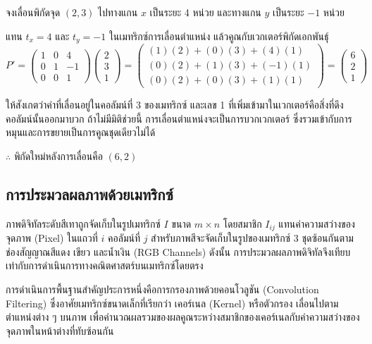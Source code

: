 \begin{ex}
\label{ex:translation-2d}
จงเลื่อนพิกัดจุด $(2, 3)$ ไปทางแกน $x$ เป็นระยะ 4 หน่วย และทางแกน $y$ เป็นระยะ $-1$ หน่วย
\end{ex}
\begin{solution}
แทน $t_x = 4$ และ $t_y = -1$ ในเมทริกซ์การเลื่อนตำแหน่ง แล้วคูณกับเวกเตอร์พิกัดเอกพันธุ์
\[ P' = \begin{pmatrix} 1 & 0 & 4 \\ 0 & 1 & -1 \\ 0 & 0 & 1 \end{pmatrix} \begin{pmatrix} 2 \\ 3 \\ 1 \end{pmatrix} = \begin{pmatrix} (1)(2)+(0)(3)+(4)(1) \\ (0)(2)+(1)(3)+(-1)(1) \\ (0)(2)+(0)(3)+(1)(1) \end{pmatrix} = \begin{pmatrix} 6 \\ 2 \\ 1 \end{pmatrix} \]

ให้สังเกตว่าค่าที่เลื่อนอยู่ในคอลัมน์ที่ 3 ของเมทริกซ์ และเลข 1 ที่เพิ่มเข้ามาในเวกเตอร์คือสิ่งที่ดึงคอลัมน์นั้นออกมาบวก ถ้าไม่มีมิติช่วยนี้ การเลื่อนตำแหน่งจะเป็นการบวกเวกเตอร์ ซึ่งรวมเข้ากับการหมุนและการขยายเป็นการคูณชุดเดียวไม่ได้

$\therefore$ พิกัดใหม่หลังการเลื่อนคือ $(6, 2)$ \solhere
\end{solution}

\subsection{การประมวลผลภาพด้วยเมทริกซ์}
\label{ssec:image-processing-matrix}
ภาพดิจิทัลระดับสีเทาถูกจัดเก็บในรูปเมทริกซ์ $I$ ขนาด $m \times n$ โดยสมาชิก $I_{ij}$ แทนค่าความสว่างของจุดภาพ (Pixel) ในแถวที่ $i$ คอลัมน์ที่ $j$ สำหรับภาพสีจะจัดเก็บในรูปของเมทริกซ์ 3 ชุดซ้อนกันตามช่องสัญญาณสีแดง เขียว และน้ำเงิน (RGB Channels) ดังนั้น การประมวลผลภาพดิจิทัลจึงเทียบเท่ากับการดำเนินการทางคณิตศาสตร์บนเมทริกซ์โดยตรง~\parencite{anton2019linear}

การดำเนินการพื้นฐานสำคัญประการหนึ่งคือการกรองภาพด้วยคอนโวลูชัน (Convolution Filtering) ซึ่งอาศัยเมทริกซ์ขนาดเล็กที่เรียกว่า เคอร์เนล (Kernel) หรือตัวกรอง เลื่อนไปตามตำแหน่งต่าง ๆ บนภาพ เพื่อคำนวณผลรวมของผลคูณระหว่างสมาชิกของเคอร์เนลกับค่าความสว่างของจุดภาพในหน้าต่างที่ทับซ้อนกัน

